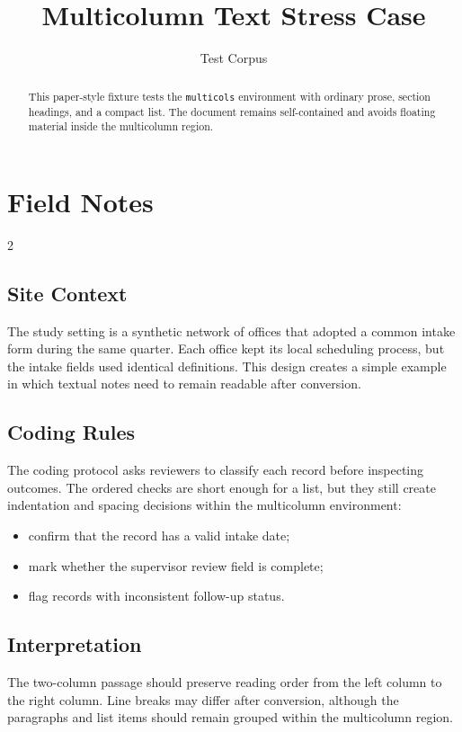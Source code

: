\documentclass[11pt]{article}
\title{Multicolumn Text Stress Case}
\author{Test Corpus}
\date{}
\begin{document}
\maketitle

\begin{abstract}
This paper-style fixture tests the \texttt{multicols} environment with ordinary
prose, section headings, and a compact list. The document remains self-contained
and avoids floating material inside the multicolumn region.
\end{abstract}

\section{Field Notes}
\label{sec:field-notes}

\begin{multicols}{2}
\subsection*{Site Context}
The study setting is a synthetic network of offices that adopted a common intake
form during the same quarter. Each office kept its local scheduling process, but
the intake fields used identical definitions. This design creates a simple
example in which textual notes need to remain readable after conversion.

\subsection*{Coding Rules}
The coding protocol asks reviewers to classify each record before inspecting
outcomes. The ordered checks are short enough for a list, but they still create
indentation and spacing decisions within the multicolumn environment:
\begin{itemize}
\item confirm that the record has a valid intake date;
\item mark whether the supervisor review field is complete;
\item flag records with inconsistent follow-up status.
\end{itemize}

\subsection*{Interpretation}
The two-column passage should preserve reading order from the left column to the
right column. Line breaks may differ after conversion, although the paragraphs
and list items should remain grouped within the multicolumn region.
\end{multicols}
\end{document}
